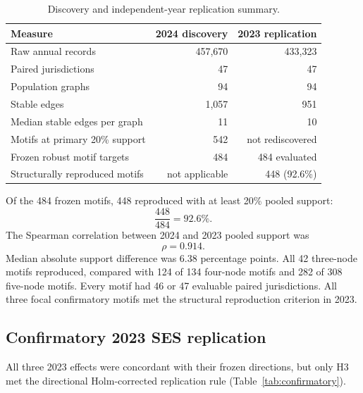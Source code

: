 \documentclass[11pt]{article}
\begin{document}
\begin{table}[htbp]
  \centering
  \caption{Discovery and independent-year replication summary.}
  \label{tab:year-summary}
  \begin{tabularx}{\textwidth}{Yrr}
    \toprule
    Measure & 2024 discovery & 2023 replication \\
    \midrule
    Raw annual records & 457,670 & 433,323 \\
    Paired jurisdictions & 47 & 47 \\
    Population graphs & 94 & 94 \\
    Stable edges & 1,057 & 951 \\
    Median stable edges per graph & 11 & 10 \\
    Motifs at primary 20\% support & 542 & not rediscovered \\
    Frozen robust motif targets & 484 & 484 evaluated \\
    Structurally reproduced motifs & not applicable & 448 (92.6\%) \\
    \bottomrule
  \end{tabularx}
\end{table}

Of the 484 frozen motifs, 448 reproduced with at least 20\% pooled support:
\begin{equation}
  \frac{448}{484}=92.6\%.
\end{equation}
The Spearman correlation between 2024 and 2023 pooled support was
\begin{equation}
  \rho=0.914.
\end{equation}
Median absolute support difference was 6.38 percentage points. All 42
three-node motifs reproduced, compared with 124 of 134 four-node motifs and
282 of 308 five-node motifs. Every motif had 46 or 47 evaluable paired
jurisdictions. All three focal confirmatory motifs met the structural
reproduction criterion in 2023.

\subsection{Confirmatory 2023 SES replication}

All three 2023 effects were concordant with their frozen directions, but only
H3 met the directional Holm-corrected replication rule
(Table~\ref{tab:confirmatory}).
\end{document}

